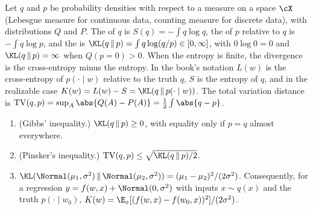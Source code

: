 \begin{refsection}
\begin{definition}\label{def:toolkit:kl}
Let $q$ and $p$ be probability densities with respect to a measure on a space $\cX$ (Lebesgue measure for continuous data, counting measure for discrete data), with distributions $Q$ and $P$. The  of $q$ is $S(q)=-\int q\log q$, the  of $p$ relative to $q$ is $-\int q\log p$, and the  is $\KL(q\,\|\,p)=\int q\log(q/p)\in[0,\infty]$, with $0\log0=0$ and $\KL(q\,\|\,p)=\infty$ when $Q(p=0)>0$. When the entropy is finite, the divergence is the cross-entropy minus the entropy. In the book's notation $L(w)$ is the cross-entropy of $p(\cdot\mid w)$ relative to the truth $q$, $S$ is the entropy of $q$, and in the realizable case $K(w)=L(w)-S=\KL(q\,\|\,p(\cdot\mid w))$. The total variation distance is $\mathrm{TV}(q,p)=\sup_A\abs{Q(A)-P(A)}=\frac12\int\abs{q-p}$.
\begin{enumerate}
\item (Gibbs' inequality.) $\KL(q\,\|\,p)\ge0$, with equality only if $p=q$ almost everywhere.
\item (Pinsker's inequality.) $\mathrm{TV}(q,p)\le\sqrt{\KL(q\,\|\,p)/2}$.
\item $\KL(\Normal(\mu_1,\sigma^2)\,\|\,\Normal(\mu_2,\sigma^2))=(\mu_1-\mu_2)^2/(2\sigma^2)$. Consequently, for a regression $y=f(w,x)+\Normal(0,\sigma^2)$ with inputs $x\sim q(x)$ and the truth $p(\cdot\mid w_0)$, $K(w)=\E_x[(f(w,x)-f(w_0,x))^2]/(2\sigma^2)$.
\end{enumerate}
\end{definition}


\end{refsection}
